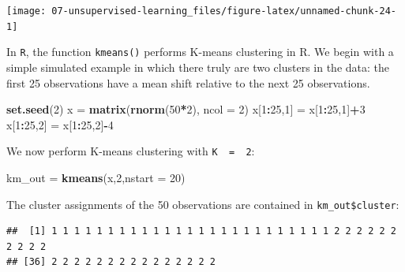 \documentclass[openany]{book}
\newenvironment{Shaded}{\begin{snugshade}}{\end{snugshade}}
\newcommand{\DataTypeTok}[1]{\textcolor[rgb]{0.13,0.29,0.53}{#1}}
\newcommand{\DecValTok}[1]{\textcolor[rgb]{0.00,0.00,0.81}{#1}}
\newcommand{\KeywordTok}[1]{\textcolor[rgb]{0.13,0.29,0.53}{\textbf{#1}}}
\newcommand{\NormalTok}[1]{#1}
\newcommand{\OperatorTok}[1]{\textcolor[rgb]{0.81,0.36,0.00}{\textbf{#1}}}
\newcommand{\StringTok}[1]{\textcolor[rgb]{0.31,0.60,0.02}{#1}}
\begin{document}
\begin{center}\texttt{[image: 07-unsupervised-learning\_files/figure-latex/unnamed-chunk-24-1]} \end{center}

In \texttt{R}, the function \texttt{kmeans()} performs K-means clustering in R. We begin with
a simple simulated example in which there truly are two clusters in the
data: the first 25 observations have a mean shift relative to the next 25
observations.

\begin{Shaded}
\begin{Highlighting}[]
\KeywordTok{set.seed}\NormalTok{(}\DecValTok{2}\NormalTok{)}
\NormalTok{x =}\StringTok{ }\KeywordTok{matrix}\NormalTok{(}\KeywordTok{rnorm}\NormalTok{(}\DecValTok{50}\OperatorTok{*}\DecValTok{2}\NormalTok{), }\DataTypeTok{ncol =} \DecValTok{2}\NormalTok{)}
\NormalTok{x[}\DecValTok{1}\OperatorTok{:}\DecValTok{25}\NormalTok{,}\DecValTok{1}\NormalTok{] =}\StringTok{ }\NormalTok{x[}\DecValTok{1}\OperatorTok{:}\DecValTok{25}\NormalTok{,}\DecValTok{1}\NormalTok{]}\OperatorTok{+}\DecValTok{3}
\NormalTok{x[}\DecValTok{1}\OperatorTok{:}\DecValTok{25}\NormalTok{,}\DecValTok{2}\NormalTok{] =}\StringTok{ }\NormalTok{x[}\DecValTok{1}\OperatorTok{:}\DecValTok{25}\NormalTok{,}\DecValTok{2}\NormalTok{]}\OperatorTok{-}\DecValTok{4}
\end{Highlighting}
\end{Shaded}

We now perform K-means clustering with \texttt{K\ \ =\ \ 2}:

\begin{Shaded}
\begin{Highlighting}[]
\NormalTok{km_out =}\StringTok{ }\KeywordTok{kmeans}\NormalTok{(x,}\DecValTok{2}\NormalTok{,}\DataTypeTok{nstart =} \DecValTok{20}\NormalTok{)}
\end{Highlighting}
\end{Shaded}

The cluster assignments of the 50 observations are contained in
\texttt{km\_out\$cluster}:

\begin{Shaded}
\end{Shaded}

\begin{verbatim}
##  [1] 1 1 1 1 1 1 1 1 1 1 1 1 1 1 1 1 1 1 1 1 1 1 1 1 1 2 2 2 2 2 2 2 2 2 2
## [36] 2 2 2 2 2 2 2 2 2 2 2 2 2 2 2
\end{verbatim}
\end{document}
